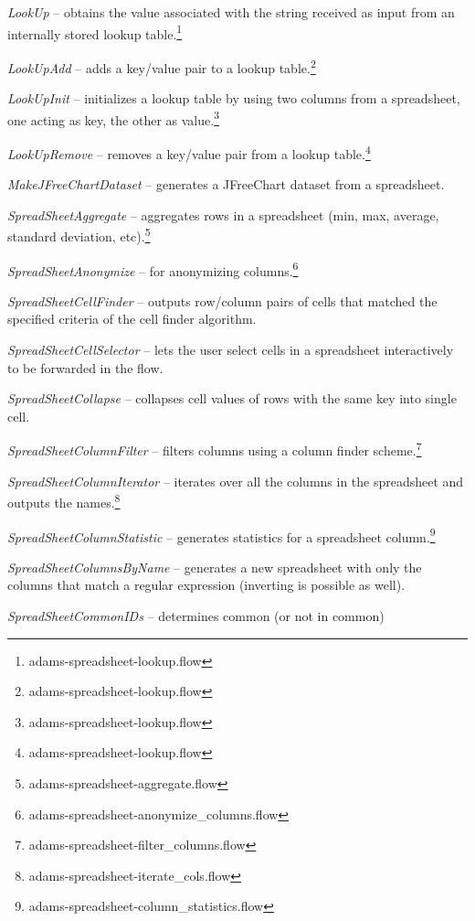 \documentclass[a4paper]{book}
\begin{document}
\begin{tight_itemize}
	\item \textit{LookUp} -- obtains the value associated with the string 
	received as input from an internally stored lookup 
	table.\footnote{adams-spreadsheet-lookup.flow}
	\item \textit{LookUpAdd} -- adds a key/value pair to a lookup 
	table.\footnote{adams-spreadsheet-lookup.flow}
	\item \textit{LookUpInit} -- initializes a lookup table by using two columns
	from a spreadsheet, one acting as key, the other as 
	value.\footnote{adams-spreadsheet-lookup.flow}
	\item \textit{LookUpRemove} -- removes a key/value pair from a lookup 
	table.\footnote{adams-spreadsheet-lookup.flow}
	\item \textit{MakeJFreeChartDataset} -- generates a JFreeChart\cite{jfreechart} dataset
	from a spreadsheet.
	\item \textit{SpreadSheetAggregate} -- aggregates rows in a spreadsheet
	(min, max, average, standard deviation, etc).\footnote{adams-spreadsheet-aggregate.flow}
	\item \textit{SpreadSheetAnonymize} -- for anonymizing 
	columns.\footnote{adams-spreadsheet-anonymize\_columns.flow}
	\item \textit{SpreadSheetCellFinder} -- outputs row/column pairs of
	cells that matched the specified criteria of the cell finder algorithm.
	\item \textit{SpreadSheetCellSelector} -- lets the user select cells in
	a spreadsheet interactively to be forwarded in the flow.
	\item \textit{SpreadSheetCollapse} -- collapses cell values of rows with
	the same key into single cell.
	\item \textit{SpreadSheetColumnFilter} -- filters columns using a column
	finder scheme.\footnote{adams-spreadsheet-filter\_columns.flow}
	\item \textit{SpreadSheetColumnIterator} -- iterates over all the columns
	in the spreadsheet and outputs the names.\footnote{adams-spreadsheet-iterate\_cols.flow}
	\item \textit{SpreadSheetColumnStatistic} -- generates statistics for a 
	spreadsheet column.\footnote{adams-spreadsheet-column\_statistics.flow}
	\item \textit{SpreadSheetColumnsByName} -- generates a new spreadsheet with
	only the columns that match a regular expression (inverting is possible as well).
	\item \textit{SpreadSheetCommonIDs} -- determines common (or not in common)

\end{tight_itemize}
\end{document}
